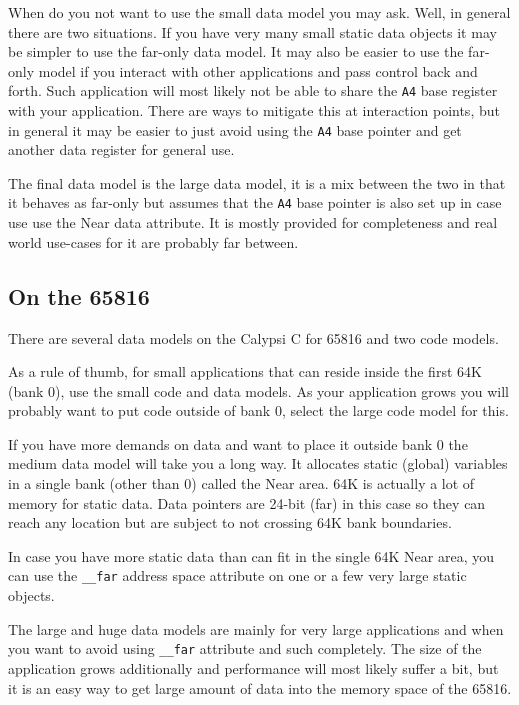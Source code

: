 When do you not want to use the small data model you may ask. Well, in
general there are two situations. If you have very many small static
data objects it may be simpler to use the far-only data model. It may
also be easier to use the far-only model if you interact with other
applications and pass control back and forth. Such application will
most likely not be able to share the {\tt A4} base register with your
application. There are ways to mitigate this at interaction points,
but in general it may be easier to just avoid using the {\tt A4} base
pointer and get another data register for general use.

The final data model is the large data model, it is a mix between the
two in that it behaves as far-only but assumes that the {\tt A4} base
pointer is also set up in case use use the Near data attribute. It is
mostly provided for completeness and real world use-cases for it are
probably far between.

\subsection*{On the 65816}

There are several data models on the Calypsi C for 65816 and two code
models.

As a rule of thumb, for small applications that can reside inside the
first 64K (bank 0), use the small code and data models. As your
application grows you will probably want to put code outside of bank
0, select the large code model for this.

If you have more demands on data and want to place it outside bank 0
the medium data model will take you a long way. It allocates static
(global) variables in a single bank (other than 0) called the Near
area. 64K is actually a lot of memory for static data. Data pointers
are 24-bit (far) in this case so they can reach any location but are
subject to not crossing 64K bank boundaries.

In case you have more static data than can fit in the single 64K Near
area, you can use the {\tt \_\_far} address space attribute on one or a
few very large static objects.

The large and huge data models are mainly for very large applications
and when you want to avoid using {\tt \_\_far} attribute and such
completely. The size of the application grows additionally and
performance will most likely suffer a bit, but it is an easy way to
get large amount of data into the memory space of the 65816.


